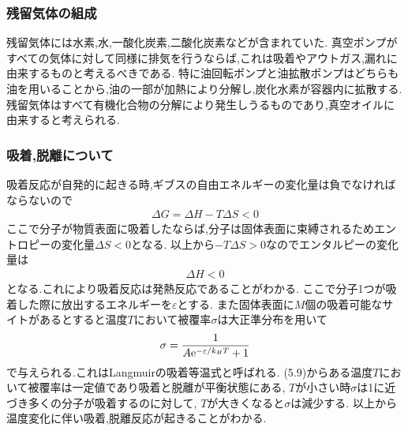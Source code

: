\subsubsection{残留気体の組成}
残留気体には水素,水,一酸化炭素,二酸化炭素などが含まれていた.
真空ポンプがすべての気体に対して同様に排気を行うならば,これは吸着やアウトガス,漏れに由来するものと考えるべきである.
特に油回転ポンプと油拡散ポンプはどちらも油を用いることから,油の一部が加熱により分解し,炭化水素が容器内に拡散する.\cite{pump18:online}
残留気体はすべて有機化合物の分解により発生しうるものであり,真空オイルに由来すると考えられる.
\subsubsection{吸着,脱離について}
吸着反応が自発的に起きる時,ギブスの自由エネルギーの変化量は負でなければならないので
\begin{align}
  \Delta G=\Delta H-T\Delta S<0
\end{align}
ここで分子が物質表面に吸着したならば,分子は固体表面に束縛されるためエントロピーの変化量$\Delta S<0$となる.
以上から$-T\Delta S>0$なのでエンタルピーの変化量は
\begin{align}
  \Delta H<0
\end{align}
となる.これにより吸着反応は発熱反応であることがわかる.
ここで分子1つが吸着した際に放出するエネルギーを$\varepsilon$とする.
また固体表面に$M$個の吸着可能なサイトがあるとすると温度$T$において被覆率$\sigma$は大正準分布を用いて
\begin{align}
  \sigma=\frac{1}{A{\rm e}^{-\varepsilon/k_BT}+1}
\end{align}
で与えられる.\cite{StatPhys36:online}これはLangmuirの吸着等温式と呼ばれる.
(5.9)からある温度$T$において被覆率は一定値であり吸着と脱離が平衡状態にある,
$T$が小さい時$\sigma$は1に近づき多くの分子が吸着するのに対して,
$T$が大きくなると$\sigma$は減少する.
以上から温度変化に伴い吸着,脱離反応が起きることがわかる.